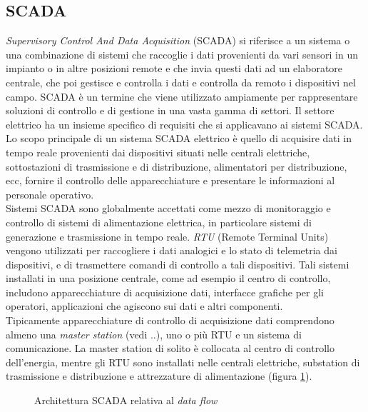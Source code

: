 \subsection{SCADA}
\emph{Supervisory Control And Data Acquisition} (SCADA) si riferisce a un sistema o una combinazione di sistemi che raccoglie i dati provenienti da vari sensori in un impianto o in altre posizioni remote e che invia questi dati ad un elaboratore centrale, che poi gestisce e controlla i dati e controlla da remoto i dispositivi nel campo. SCADA è un termine che viene utilizzato ampiamente per rappresentare soluzioni di controllo e di gestione in una vasta gamma di settori. Il settore elettrico ha un insieme specifico di requisiti che si applicavano ai sistemi SCADA. Lo scopo principale di un sistema SCADA elettrico è quello di acquisire dati in tempo reale provenienti dai dispositivi situati nelle centrali elettriche, sottostazioni di trasmissione e di distribuzione, alimentatori per distribuzione, ecc, fornire il controllo delle apparecchiature e presentare le informazioni al personale operativo.  
\\
Sistemi SCADA sono globalmente accettati come mezzo di monitoraggio e controllo di sistemi di alimentazione elettrica, in particolare sistemi di generazione e trasmissione in tempo reale. \emph{RTU} (Remote Terminal Units) vengono utilizzati per raccogliere i dati analogici e lo stato di telemetria dai dispositivi, e di trasmettere comandi di controllo a tali dispositivi. Tali sistemi installati in una posizione centrale, come ad esempio il centro di controllo, includono apparecchiature di acquisizione dati, interfacce grafiche per gli operatori, applicazioni che agiscono sui dati e altri componenti. 
\\
Tipicamente apparecchiature di controllo di acquisizione dati comprendono almeno una \emph{master station} (vedi ..), uno o più RTU e un sistema di comunicazione. La master station di solito è collocata al centro di controllo dell'energia, mentre gli RTU sono installati nelle centrali elettriche, substation di trasmissione e distribuzione e attrezzature di alimentazione (figura \ref{fig:24}).

\begin{figure}[h] 
\caption{Architettura SCADA relativa al \emph{data flow}}\label{fig:24}
\end{figure}



